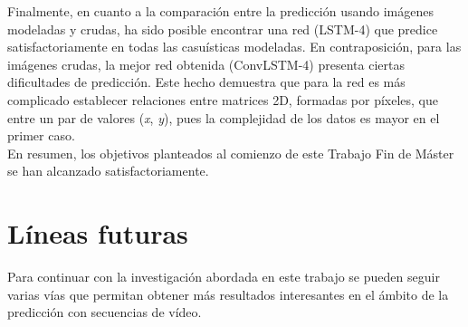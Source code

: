 Finalmente, en cuanto a la comparación entre la predicción usando imágenes modeladas y crudas, ha sido posible encontrar una red (LSTM-4) que predice satisfactoriamente en todas las casuísticas modeladas. En contraposición, para las imágenes crudas, la mejor red obtenida (ConvLSTM-4) presenta ciertas dificultades de predicción. Este hecho demuestra que para la red es más complicado establecer relaciones entre matrices 2D, formadas por píxeles, que entre un par de valores (\textit{x}, \textit{y}), pues la complejidad de los datos es mayor en el primer caso.\\

En resumen,  los objetivos planteados al comienzo de este Trabajo Fin de Máster se han alcanzado satisfactoriamente.

\section{Líneas futuras}
Para continuar con la investigación abordada en este trabajo se pueden seguir varias vías que permitan obtener más resultados interesantes en el ámbito de la predicción con secuencias de vídeo.

